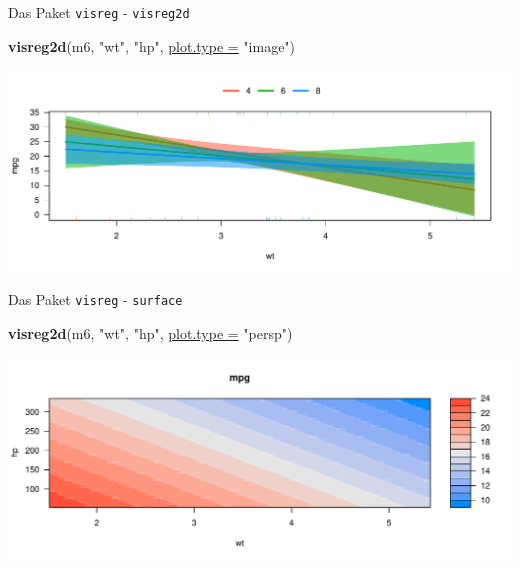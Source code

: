\documentclass[
  ignorenonframetext,
]{beamer}
\newenvironment{Shaded}{\begin{snugshade}}{\end{snugshade}}
\newcommand{\DataTypeTok}[1]{\textcolor[rgb]{0.74,0.68,0.62}{\underline{#1}}}
\newcommand{\KeywordTok}[1]{\textcolor[rgb]{0.26,0.66,0.93}{\textbf{#1}}}
\newcommand{\NormalTok}[1]{\textcolor[rgb]{0.74,0.68,0.62}{#1}}
\newcommand{\StringTok}[1]{\textcolor[rgb]{0.02,0.61,0.04}{#1}}
\begin{document}
\begin{frame}[fragile]{Das Paket \texttt{visreg} - \texttt{visreg2d}}
\protect\hypertarget{das-paket-visreg---visreg2d}{}

\begin{Shaded}
\begin{Highlighting}[]
\KeywordTok{visreg2d}\NormalTok{(m6, }\StringTok{"wt"}\NormalTok{, }\StringTok{"hp"}\NormalTok{, }\DataTypeTok{plot.type =} \StringTok{"image"}\NormalTok{)}
\end{Highlighting}
\end{Shaded}

\includegraphics{LineareRegression_files/figure-beamer/unnamed-chunk-48-1.pdf}

\end{frame}

\begin{frame}[fragile]{Das Paket \texttt{visreg} - \texttt{surface}}
\protect\hypertarget{das-paket-visreg---surface}{}

\begin{Shaded}
\begin{Highlighting}[]
\KeywordTok{visreg2d}\NormalTok{(m6, }\StringTok{"wt"}\NormalTok{, }\StringTok{"hp"}\NormalTok{, }\DataTypeTok{plot.type =} \StringTok{"persp"}\NormalTok{)}
\end{Highlighting}
\end{Shaded}

\includegraphics{LineareRegression_files/figure-beamer/unnamed-chunk-49-1.pdf}

\end{frame}
\end{document}
